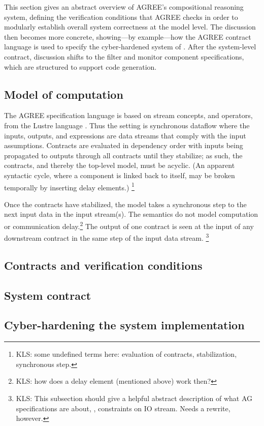 This section gives an abstract overview of AGREE's compositional
reasoning system, defining the verification conditions that AGREE
checks in order to modularly establish overall system correctness at
the model level.  The discussion then becomes more concrete,
showing---by example---how the AGREE contract language is used to
specify the cyber-hardened system of .  After the
system-level contract, discussion shifts to the filter and monitor
component specifications, which are structured to support code
generation.


\subsection{Model of computation}

The AGREE specification language is based on stream concepts, and
operators, from the Lustre language \cite{10.1145/41625.41641}.  Thus
the setting is synchronous dataflow where the inputs, outputs, and
expressions are data streams that comply with the input assumptions.
Contracts are evaluated in dependency order with inputs being
propagated to outputs through all contracts until they stabilize; as
such, the contracts, and thereby the top-level model, must be
acyclic. (An apparent syntactic cycle, where a component is linked
back to itself, may be broken temporally by inserting delay
elements.) \footnote{KLS: some undefined terms here: evaluation of
contracts, stabilization, synchronous step.}


Once the contracts have stabilized, the model takes a synchronous step
to the next input data in the input stream(s).  The semantics do not
model computation or communication delay.\footnote{KLS: how does a
delay element (mentioned above) work then?}  The output of one
contract is seen at the input of any downstream contract in the same
step of the input data stream.
\footnote{KLS: This subsection should give a helpful abstract description of what AG specifications are about, \ie, constraints on IO stream. Needs a rewrite, however.}


\subsection{Contracts and verification conditions}


\subsection{System contract}


\subsection{Cyber-hardening the system implementation}

